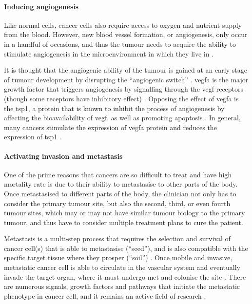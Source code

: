 \paragraph{Inducing angiogenesis}

\noindent
Like normal cells, cancer cells also require access to oxygen and nutrient supply from the blood.
However, new blood vessel formation, or angiogenesis, only occur in a handful of occasions, and thus the tumour needs to acquire the ability to stimulate angiogenesis in the microenvironment in which they live in \citep{Hanahan2011}.

It is thought that the angiogenic ability of the tumour is gained at an early stage of tumour development by disrupting the ``angiogenic switch'' \citep{Hanahan2011}.
\Gls{vegfa} is the major growth factor that triggers angiogenesis by signalling through the \acrshort{vegf} receptors (though some receptors have inhibitory effect) \citep{Yancopoulos2000}.
Opposing the effect of \Gls{vegfa} is the \gls{tsp1}, a protein that is known to inhibit the process of angiogenesis by affecting the bioavailability of \acrshort{vegf}, as well as promoting apoptosis \citep{Kazerounian2008}.
In general, many cancers stimulate the expression of \gls{vegfa} protein and reduces the expression of \gls{tsp1} \citep{Kazerounian2008}.

\paragraph{Activating invasion and metastasis}

\noindent
One of the prime reasons that cancers are so difficult to treat and have high mortality rate is due to their ability to metastasise to other parts of the body.
Once metastasised to different parts of the body, the clinician not only has to consider the primary tumour site, but also the second, third, or even fourth tumour sites, which may or may not have similar tumour biology to the primary tumour, and thus have to consider multiple treatment plans to cure the patient.

Metastasis is a multi-step process that requires the selection and survival of cancer cell(s) that is able to metastasise (``seed''), and is also compatible with the specific target tissue where they prosper (``soil'') \citep{Talmadge2010}.
Once mobile and invasive, metastatic cancer cell is able to circulate in the vascular system and eventually invade the target organ, where it must undergo \gls{met} and colonise the site \citep{Hanahan2011,Kalluri2009}.
There are numerous signals, growth factors and pathways that initiate the metastatic phenotype in cancer cell, and it remains an active field of research \citep{Hanahan2011,Kalluri2009}.

